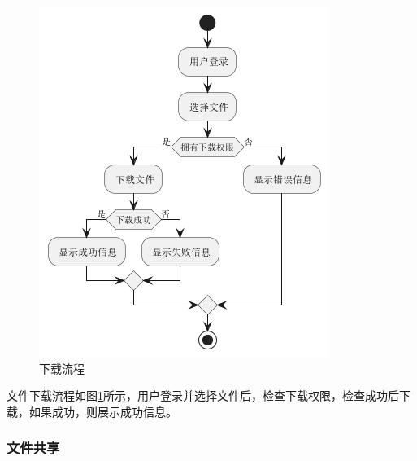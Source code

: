 \begin{figure}[H]
    \begin{center}
        \includegraphics[scale=0.7]{examples/下载流程图.png}
        \caption{下载流程}
        \label{fig:download}
    \end{center}
\end{figure}

文件下载流程如图\ref{fig:download}所示，用户登录并选择文件后，检查下载权限，检查成功后下载，如果成功，则展示成功信息。

\subsubsection{文件共享}

